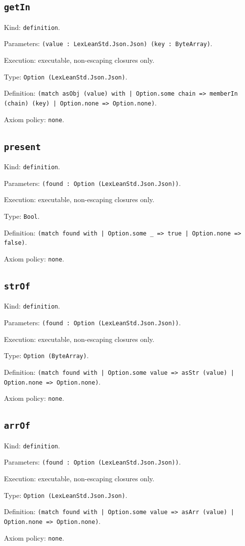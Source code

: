 \documentclass[11pt]{article}
\begin{document}
\subsection*{\texttt{getIn}}
\noindent Kind: \texttt{definition}.\par
\noindent Parameters: \texttt{(value : LexLeanStd.Json.Json) (key : ByteArray)}.\par
\noindent Execution: executable, non-escaping closures only.\par
\noindent Type: \texttt{Option (LexLeanStd.Json.Json)}.\par
\noindent Definition: \texttt{(match asObj (value) with | Option.some chain => memberIn (chain) (key) | Option.none => Option.none)}.\par
\noindent Axiom policy: \texttt{none}.\par
\subsection*{\texttt{present}}
\noindent Kind: \texttt{definition}.\par
\noindent Parameters: \texttt{(found : Option (LexLeanStd.Json.Json))}.\par
\noindent Execution: executable, non-escaping closures only.\par
\noindent Type: \texttt{Bool}.\par
\noindent Definition: \texttt{(match found with | Option.some \_ => true | Option.none => false)}.\par
\noindent Axiom policy: \texttt{none}.\par
\subsection*{\texttt{strOf}}
\noindent Kind: \texttt{definition}.\par
\noindent Parameters: \texttt{(found : Option (LexLeanStd.Json.Json))}.\par
\noindent Execution: executable, non-escaping closures only.\par
\noindent Type: \texttt{Option (ByteArray)}.\par
\noindent Definition: \texttt{(match found with | Option.some value => asStr (value) | Option.none => Option.none)}.\par
\noindent Axiom policy: \texttt{none}.\par
\subsection*{\texttt{arrOf}}
\noindent Kind: \texttt{definition}.\par
\noindent Parameters: \texttt{(found : Option (LexLeanStd.Json.Json))}.\par
\noindent Execution: executable, non-escaping closures only.\par
\noindent Type: \texttt{Option (LexLeanStd.Json.Json)}.\par
\noindent Definition: \texttt{(match found with | Option.some value => asArr (value) | Option.none => Option.none)}.\par
\noindent Axiom policy: \texttt{none}.\par
\end{document}
